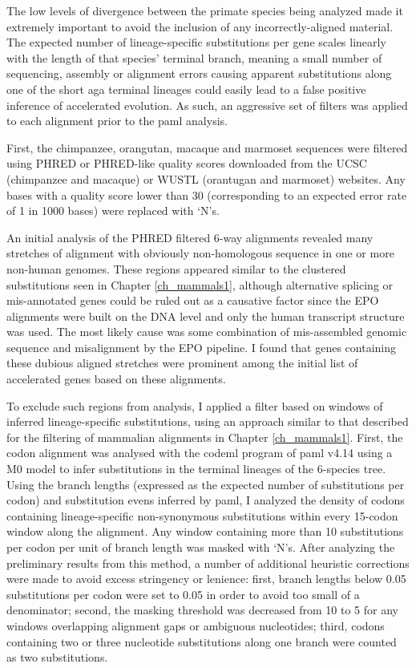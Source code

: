 The low levels of divergence between the primate species being
analyzed made it extremely important to avoid the inclusion of any
incorrectly-aligned material. The expected number of lineage-specific
substitutions per gene scales linearly with the length of that
species' terminal branch, meaning a small number of sequencing,
assembly or alignment errors causing apparent \nsyn substitutions
along one of the short \ac{aga} terminal lineages could easily lead to
a false positive inference of accelerated evolution. As such, an
aggressive set of filters was applied to each alignment prior to the
\ac{paml} analysis.

First, the chimpanzee, orangutan, macaque and marmoset sequences were
filtered using PHRED or PHRED-like quality scores downloaded from the
UCSC (chimpanzee and macaque) or WUSTL (orantugan and marmoset)
websites. Any bases with a quality score lower than 30 (corresponding
to an expected error rate of 1 in 1000 bases) were replaced with `N's.

An initial analysis of the PHRED filtered 6-way alignments revealed
many stretches of alignment with obviously non-homologous sequence in
one or more non-human genomes. These regions appeared similar to the
clustered substitutions seen in Chapter \ref{ch_mammals1}, although
alternative splicing or mis-annotated genes could be ruled out as a
causative factor since the EPO alignments were built on the DNA level
and only the human transcript structure was used. The most likely
cause was some combination of mis-assembled genomic sequence and
misalignment by the EPO pipeline. I found that genes containing these
dubious aligned stretches were prominent among the initial list of
accelerated genes based on these alignments.

To exclude such regions from analysis, I applied a filter based on
windows of inferred lineage-specific substitutions, using an approach
similar to that described for the filtering of mammalian alignments in
Chapter \ref{ch_mammals1}. First, the codon alignment was analysed
with the codeml program of \ac{paml} v4.14 using a M0 model to infer
substitutions in the terminal lineages of the 6-species tree. Using
the branch lengths (expressed as the expected number of substitutions
per codon) and substitution evens inferred by \ac{paml}, I analyzed
the density of codons containing lineage-specific non-synonymous
substitutions within every 15-codon window along the alignment. Any
window containing more than 10 \nsyn substitutions per codon per unit
of branch length was masked with `N's. After analyzing the preliminary
results from this method, a number of additional heuristic corrections
were made to avoid excess stringency or lenience: first, branch
lengths below 0.05 substitutions per codon were set to 0.05 in order
to avoid too small of a denominator; second, the masking threshold was
decreased from 10 to 5 for any windows overlapping alignment gaps or
ambiguous nucleotides; third, codons containing two or three
nucleotide substitutions along one branch were counted as two \nsyn
substitutions.

